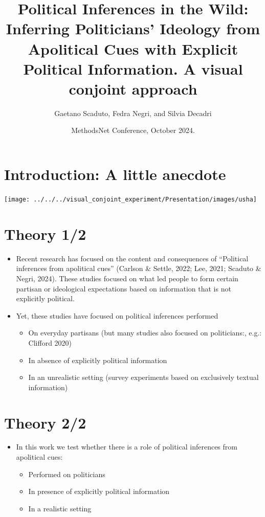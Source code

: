 \documentclass[
]{article}
\title{Political Inferences in the Wild: Inferring Politicians' Ideology
from Apolitical Cues with Explicit Political Information. A visual
conjoint approach}
\author{Gaetano Scaduto\inst{1}, Fedra Negri\inst{1}, and Silvia
Decadri\inst{1}}
\date{MethodsNet Conference, October 2024.}
\providecommand{\tightlist}{%
  \setlength{\itemsep}{0pt}\setlength{\parskip}{0pt}}
\begin{document}
\maketitle

\section{Introduction: A little
anecdote}\label{introduction-a-little-anecdote}

\begin{center}\texttt{[image: ../../../visual\_conjoint\_experiment/Presentation/images/usha]} \end{center}

\section{Theory 1/2}\label{theory-12}

\begin{itemize}
\item
  Recent research has focused on the content and consequences of
  ``Political inferences from apolitical cues'' (Carlson \& Settle,
  2022; Lee, 2021; Scaduto \& Negri, 2024). These studies focused on
  what led people to form certain partisan or ideological expectations
  based on information that is not explicitly political.
\item
  Yet, these studies have focused on political inferences performed

  \begin{itemize}
  \tightlist
  \item
    On everyday partisans (but many studies also focused on
    politicians:, e.g.: Clifford 2020)
  \item
    In absence of explicitly political information
  \item
    In an unrealistic setting (survey experiments based on exclusively
    textual information)
  \end{itemize}
\end{itemize}

\section{Theory 2/2}\label{theory-22}

\begin{itemize}
\tightlist
\item
  In this work we test whether there is a role of political inferences
  from apolitical cues:

  \begin{itemize}
  \tightlist
  \item
    Performed on politicians
  \item
    In presence of explicitly political information
  \item
    In a realistic setting
  \end{itemize}
\end{itemize}
\end{document}
